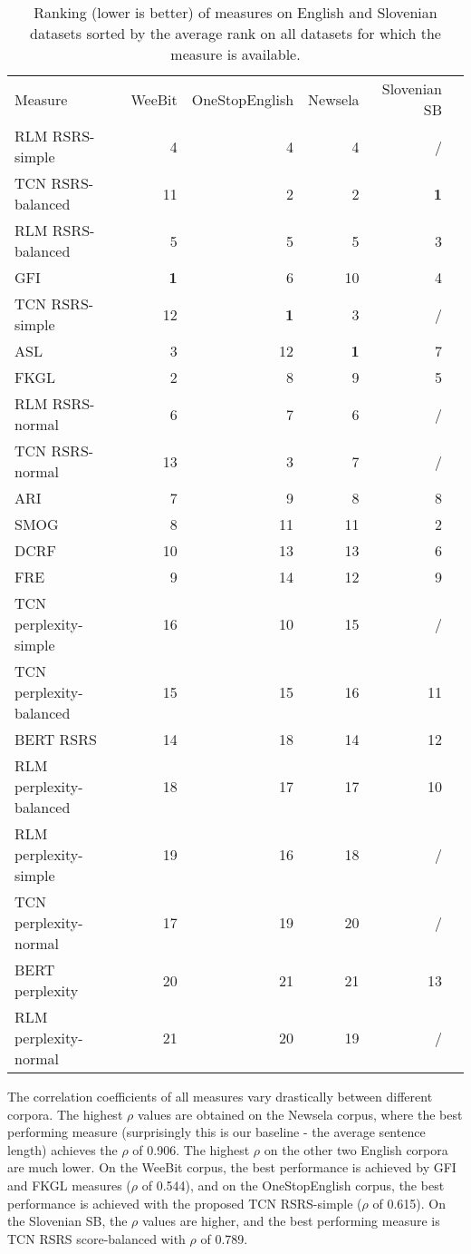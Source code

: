 \documentclass{clv3}
\begin{document}
\begin{table*}[t]
\begin{center}
\caption{Ranking (lower is better) of measures on English and Slovenian datasets sorted by the average rank on all datasets for which the measure is available.}
\begin{tabular}{lrrrrr}
    \hline
    Measure & WeeBit & OneStopEnglish & Newsela & Slovenian SB \\
    RLM RSRS-simple & 4 & 4 & 4 & /  \\
    TCN RSRS-balanced & 11 & 2 & 2 & \textbf{1}  \\
    RLM RSRS-balanced & 5 & 5 & 5 & 3  \\
    GFI & \textbf{1} & 6 & 10 & 4  \\
    TCN RSRS-simple & 12 & \textbf{1} & 3 & /  \\
    ASL & 3 & 12 & \textbf{1} & 7  \\
    FKGL & 2 & 8 & 9 & 5  \\
    RLM RSRS-normal & 6 & 7 & 6 & /  \\
    TCN RSRS-normal & 13 & 3 & 7 & /  \\
    ARI & 7 & 9 & 8 & 8  \\
    SMOG & 8 & 11 & 11 & 2  \\
    DCRF & 10 & 13 & 13 & 6  \\
    FRE & 9 & 14 & 12 & 9  \\
    TCN perplexity-simple & 16 & 10 & 15 & / \\
    TCN perplexity-balanced & 15 & 15 & 16 & 11 \\
    BERT RSRS & 14 & 18 & 14 & 12  \\
    RLM perplexity-balanced & 18 & 17 & 17 & 10  \\
    RLM perplexity-simple & 19 & 16 & 18 & / \\
    TCN perplexity-normal & 17 & 19 & 20 & /  \\
    BERT perplexity & 20 & 21 & 21 & 13  \\
    RLM perplexity-normal & 21 & 20 & 19 & / \\
    \hline
\end{tabular}
\label{table:rankEng}
 \end{center}
\end{table*}


The correlation coefficients of all measures vary drastically between different corpora. The highest $\rho$ values are obtained on the Newsela corpus, where the best performing measure (surprisingly this is our baseline - the average sentence length) achieves the $\rho$ of 0.906. The highest $\rho$ on the other two English corpora are much lower. On the WeeBit corpus, the best performance is achieved by GFI and FKGL measures ($\rho$ of 0.544), and on the OneStopEnglish corpus, the best performance is achieved with the proposed TCN RSRS-simple ($\rho$ of 0.615). On the Slovenian SB, the $\rho$ values are higher, and the best performing measure is TCN RSRS score-balanced with $\rho$ of 0.789.
\end{document}
